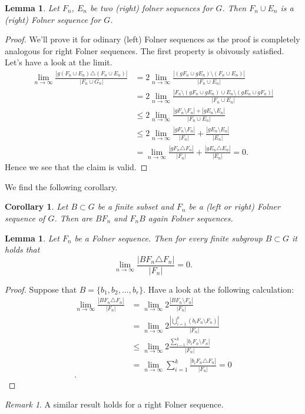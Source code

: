 \documentclass[titlepage, a4paper]{article}
\newcommand{\card}[1]{\left| #1 \right|}
\newtheorem{lemma}[theorem]{Lemma}
\newtheorem{corollary}[theorem]{Corollary}
\theoremstyle{remark}
\newtheorem{remark}[theorem]{Remark}
\begin{document}
\begin{lemma}
	Let $F_n$, $E_n$ be two (right) folner sequences for $G$. Then $F_n \cup E_n$ is a (right) Folner sequence for $G$.
\end{lemma}
\begin{proof}
	We'll prove it for odinary (left) Folner sequences as the proof is completely analogous for right Folner sequences.
	The first property is obivously satisfied. 
	Let's have a look at the limit.
	\begin{align*}
		\lim_{n \to \infty} \frac{\card{g(F_n \cup E_n) \triangle (F_n \cup E_n)}}{\card{F_n \cup G_n}} &= 2 \lim_{n \to \infty} \frac{\card{(gF_n \cup gE_n)\setminus (F_n \cup E_n)}}{\card{F_n \cup E_n}} \\
														&= 2 \lim_{n \to \infty} \frac{\card{F_n \setminus (gF_n \cup g E_n) \cup E_n\setminus (gE_n \cup gF_n) }}{\card{F_n \cup E_n}} \\
														&\le 2 \lim_{n \to \infty} \frac{\card{gF_n \setminus F_n} + \card{gE_n \setminus E_n}}{\card{F_n \cup E_n}}\\
														&\le 2 \lim_{n \to \infty}  \frac{\card{gF_n \setminus F_n}}{\card{F_n}} + \frac{\card{gE_n \setminus E_n}}{\card{E_n}} \\
														&=  \lim_{n \to \infty} \frac{\card{gF_n \triangle F_n}}{\card{F_n}} +  \frac{\card{gE_n \triangle E_n}}{\card{E_n}}= 0  
	.\end{align*}
	Hence we see that the claim is valid.
\end{proof}
We find the following corollary. 
\begin{corollary}\label{cor:product_folner_sequence}
	Let $B \subset G$ be a finite subset and $F_n$ be a (left or right) Folner sequence of $G$. Then are $BF_n$ and $F_nB$ again Folner sequences.
\end{corollary}

\begin{lemma}\label{lem:folner_finite_subset}
	Let $F_n$ be a Folner sequence. Then for every finite subgroup $B \subset G$ it holds that  \[
	\lim_{n \to \infty} \frac{\card{BF_n \triangle F_n}}{\card{F_n}} = 0	
	.\] 
\end{lemma}
\begin{proof}
	Suppose that $B = \{b_1, b_2, \ldots, b_r\} $. 
	Have a look at the following calculation:
	\begin{align*}
		\lim_{n \to \infty} \frac{\card{BF_n \triangle F_n}}{\card{F_n}} &= \lim_{n \to \infty} 2 \frac{\card{BF_n \setminus F_n}}{\card{F_n}} \\
										 &= \lim_{n \to \infty} 2 \frac{\card{\bigcup_{i = 1}^{k} (b_i F_n \setminus F_n)}}{\card{F_n}} \\
										 &\le \lim_{n \to \infty} 2\frac{\sum_{i-1}^{k} \card{b_i F_n \setminus F_n}}{\card{F_n}} \\
										 &= \lim_{n \to \infty} \sum_{i = 1}^{k} \frac{\card{b_iF_n \triangle F_n}}{\card{F_n}} = 0  \\
	.\end{align*}
\end{proof}
\begin{remark}
	A similar result holds for a right Folner sequence.
\end{remark}
\end{document}
